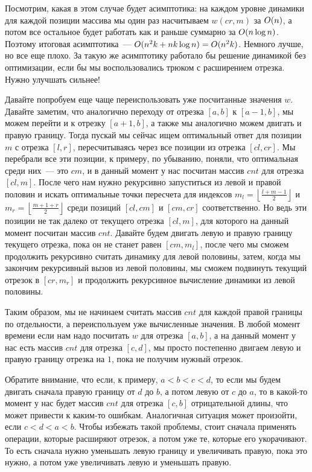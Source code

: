 Посмотрим, какая в этом случае будет асимптотика: на каждом уровне динамики для каждой позиции массива мы один раз насчитываем $w(cr, m)$ за $O(n)$, а потом все остальное будет работать как и раньше суммарно за $O(n \log n)$. Поэтому итоговая асимптотика~--- $O(n^2 k + n k \log n) = O(n^2 k)$. Немного лучше, но все еще плохо. За такую же асимптотику работало бы решение динамикой без оптимизации, если бы мы воспользовались трюком с расширением отрезка. Нужно улучшать сильнее!

Давайте попробуем еще чаще переиспользовать уже посчитанные значения $w$. Давайте заметим, что аналогично переходу от отрезка $[a, b]$ к $[a - 1, b]$, мы можем перейти и к отрезку $[a + 1, b]$, а также мы аналогично можем двигать и правую границу. Тогда пускай мы сейчас ищем оптимальный ответ для позиции $m$ с отрезка $[l, r]$, пересчитываясь через все позиции из отрезка $[cl, cr]$. Мы перебрали все эти позиции, к примеру, по убыванию, поняли, что оптимальная среди них~--- это $cm$, и в данный момент у нас посчитан массив $cnt$ для отрезка $[cl, m]$. После чего нам нужно рекурсивно запуститься из левой и правой половин и искать оптимальные точки пересчета для индексов $m_l = \left\lfloor \frac{l + m - 1}{2} \right\rfloor$ и $m_r = \left\lfloor \frac{m + 1 + r}{2} \right\rfloor$ среди позиций $[cl, cm]$ и $[cm, cr]$ соответственно. Но ведь эти позиции не так далеко от текущего отрезка $[cl, m]$, для которого на данный момент посчитан массив $cnt$. Давайте будем двигать левую и правую границу текущего отрезка, пока он не станет равен $[cm, m_l]$, после чего мы сможем продолжить рекурсивно считать динамику для левой половины, затем, когда мы закончим рекурсивный вызов из левой половины, мы сможем подвинуть текущий отрезок в $[cr, m_r]$ и продолжить рекурсивное вычисление динамики из левой половины.

Таким образом, мы не начинаем считать массив $cnt$ для каждой правой границы по отдельности, а переиспользуем уже вычисленные значения. В любой момент времени если нам надо посчитать $w$ для отрезка $[a, b]$, а на данный момент у нас есть массив $cnt$ для отрезка $[c, d]$, мы просто постепенно двигаем левую и правую границу отрезка на $1$, пока не получим нужный отрезок.

\begin{observation}
    Обратите внимание, что если, к примеру, $a < b < c < d$, то если мы будем двигать сначала правую границу от $d$ до $b$, а потом левую от $c$ до $a$, то в какой-то момент у нас будет массив $cnt$ для отрезка $[c, b]$ отрицательной длины, что может привести к каким-то ошибкам. Аналогичная ситуация может произойти, если $c < d < a < b$. Чтобы избежать такой проблемы, стоит сначала применять операции, которые расширяют отрезок, а потом уже те, которые его укорачивают. То есть сначала нужно уменьшать левую границу и увеличивать правую, пока это нужно, а потом уже увеличивать левую и уменьшать правую.
\end{observation}

